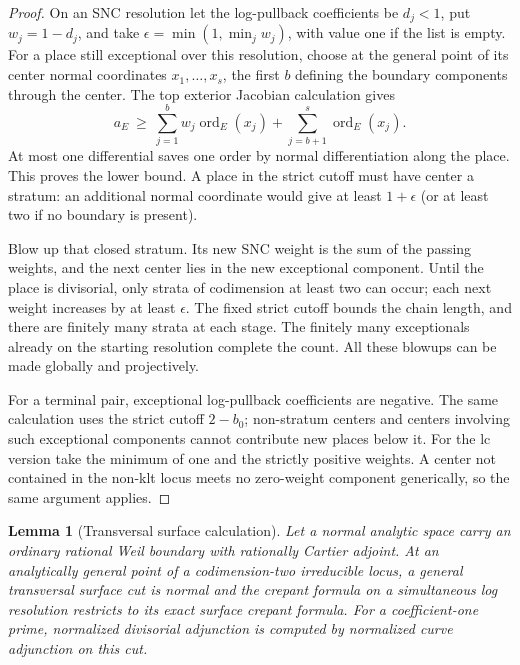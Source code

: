 \documentclass[11pt,letterpaper]{article}
\newtheorem{lemma}[theorem]{Lemma}
\theoremstyle{definition}
\theoremstyle{remark}
\begin{document}
\begin{proof}
On an SNC resolution let the log-pullback coefficients be $d_j<1$,
put $w_j=1-d_j$, and take
$\epsilon=\min(1,\min_jw_j)$, with value one if the list is empty.
For a place still exceptional over this resolution, choose at the
general point of its center normal coordinates $x_1,\ldots,x_s$,
the first $b$ defining the boundary components through the center.
The top exterior Jacobian calculation gives
\begin{equation}
 a_E\ \geq\ \sum_{j=1}^{b}w_j\operatorname{ord}_E(x_j)
             +\sum_{j=b+1}^{s}\operatorname{ord}_E(x_j).
 \label{bir:jacobian-bound}
\end{equation}
At most one differential saves one order by normal differentiation
along the place.  This proves the lower bound.  A place in the
strict cutoff must have center a stratum: an additional normal
coordinate would give at least $1+\epsilon$ (or at least two if no
boundary is present).

Blow up that closed stratum.  Its new SNC weight is the sum of the
passing weights, and the next center lies in the new exceptional
component.  Until the place is divisorial, only strata of codimension
at least two can occur; each next weight increases by at least
$\epsilon$.  The fixed strict cutoff bounds the chain length, and
there are finitely many strata at each stage.  The finitely many
exceptionals already on the starting resolution complete the count.
All these blowups can be made globally and projectively.

For a terminal pair, exceptional log-pullback coefficients are
negative.  The same calculation uses the strict cutoff $2-b_0$;
non-stratum centers and centers involving such exceptional
components cannot contribute new places below it.  For the lc
version take the minimum of one and the strictly positive weights.
A center not contained in the non-klt locus meets no zero-weight
component generically, so the same argument applies.
\end{proof}

\begin{lemma}[Transversal surface calculation]
\label{bir:transversal}
Let a normal analytic space carry an ordinary rational Weil boundary
with rationally Cartier adjoint.  At an analytically general point
of a codimension-two irreducible locus, a general transversal surface
cut is normal and the crepant formula on a simultaneous log resolution
restricts to its exact surface crepant formula.  For a coefficient-one
prime, normalized divisorial adjunction is computed by normalized
curve adjunction on this cut.
\end{lemma}
\end{document}
